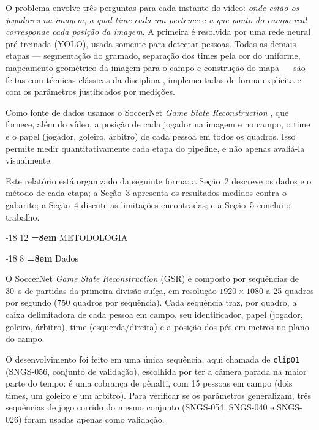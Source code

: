 \documentclass[12pt]{article}
\makeatletter
\renewcommand\section{\@startsection{section}{1}{\z@}%
                       {-18\p@ \@plus -4\p@ \@minus -4\p@}%
                       {12\p@ \@plus 4\p@ \@minus 4\p@}%
                       {\newpage\normalfont\large\bfseries\boldmath
                        \rightskip=\z@ \@plus 8em\pretolerance=10000 }}
\renewcommand\subsection{\@startsection{subsection}{2}{\z@}%
                       {-18\p@ \@plus -4\p@ \@minus -4\p@}%
                       {8\p@ \@plus 4\p@ \@minus 4\p@}%
                       {\normalfont\normalsize\bfseries\boldmath
                        \rightskip=\z@ \@plus 8em\pretolerance=10000 }}
\makeatother
\begin{document}
O problema envolve três perguntas para cada instante do vídeo: \emph{onde estão os
jogadores na imagem}, \emph{a qual time cada um pertence} e \emph{a que ponto do
campo real corresponde cada posição da imagem}. A primeira é resolvida por uma rede
neural pré-treinada (YOLO), usada somente para detectar pessoas. Todas as demais
etapas --- segmentação do gramado, separação dos times pela cor do uniforme,
mapeamento geométrico da imagem para o campo e construção do mapa --- são feitas com
técnicas clássicas da disciplina \cite{gonzalez2018}, implementadas de forma explícita e com os
parâmetros justificados por medições.

Como fonte de dados usamos o SoccerNet \textit{Game State Reconstruction}
\cite{somers2024}, que fornece, além do vídeo, a posição de cada jogador na imagem e
no campo, o time e o papel (jogador, goleiro, árbitro) de cada pessoa em todos os
quadros. Isso permite medir quantitativamente cada etapa do pipeline, e não apenas
avaliá-la visualmente.

Este relatório está organizado da seguinte forma: a Seção~2 descreve os dados e o
método de cada etapa; a Seção~3 apresenta os resultados medidos contra o gabarito; a
Seção~4 discute as limitações encontradas; e a Seção~5 conclui o trabalho.

\section{METODOLOGIA}

\subsection{Dados}

O SoccerNet \textit{Game State Reconstruction} (GSR) \cite{somers2024} é composto por
sequências de 30~s de partidas da primeira divisão suíça, em resolução
$1920\times1080$ a 25 quadros por segundo (750 quadros por sequência). Cada
sequência traz, por quadro, a caixa delimitadora de cada pessoa em campo, seu
identificador, papel (jogador, goleiro, árbitro), time (esquerda/direita) e a posição
dos pés em metros no plano do campo.

O desenvolvimento foi feito em uma única sequência, aqui chamada de
\texttt{clip01} (SNGS-056, conjunto de validação), escolhida por ter a câmera parada
na maior parte do tempo: é uma cobrança de pênalti, com 15
pessoas em campo (dois times, um goleiro e um árbitro). Para verificar se os
parâmetros generalizam, três sequências de jogo corrido do mesmo conjunto
(SNGS-054, SNGS-040 e SNGS-026) foram usadas apenas como validação.
\end{document}
